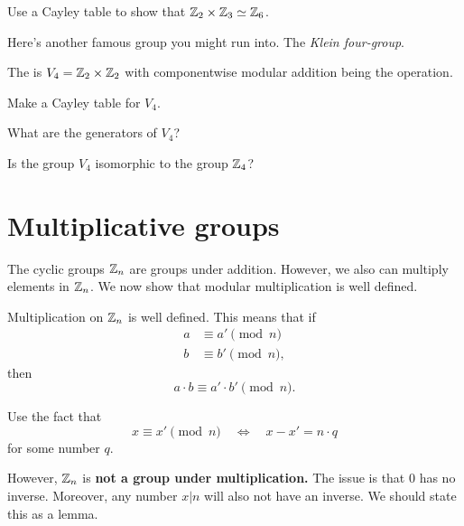\documentclass{ximera}
\begin{document}
\begin{exercise}
  Use a Cayley table to show that $\mathbb Z_2\times\mathbb Z_3 \simeq \mathbb Z_6$.
\end{exercise}



Here's another famous group you might run into. The \textit{Klein
  four-group}.

\begin{definition}
  The  is $V_4 = \mathbb Z_2\times\mathbb Z_2$ with
  componentwise modular addition being the operation.
\end{definition}

\begin{exercise}
  Make a Cayley table for $V_4$.
\end{exercise}

\begin{exercise}
  What are the generators of $V_4$?
\end{exercise}

\begin{exercise}
  Is the group $V_4$ isomorphic to the group $\mathbb Z_4$?
\end{exercise}



\section{Multiplicative groups}


The cyclic groups $\mathbb Z_n$ are groups under addition. However, we also
can multiply elements in $\mathbb Z_n$. We now show that modular
multiplication is well defined.

\begin{lemma}\label{L:mmwd}
  Multiplication on $\mathbb Z_n$ is well defined. This means that if
  \begin{align*}
    a &\equiv a' \pmod{n}\\
    b &\equiv b' \pmod{n},
  \end{align*}
  then
  \[
  a\cdot b \equiv a'\cdot b' \pmod{n}.
  \]
  \begin{sketch}
    Use the fact that
    \[
    x \equiv x'\pmod{n} \quad \Leftrightarrow \quad x -x' = n\cdot q
    \]
    for some number $q$.
  \end{sketch}
\end{lemma}

However, $\mathbb Z_n$ is \textbf{not a group under multiplication.} The
issue is that $0$ has no inverse. Moreover, any number $x|n$ will also
not have an inverse. We should state this as a lemma.
\end{document}
